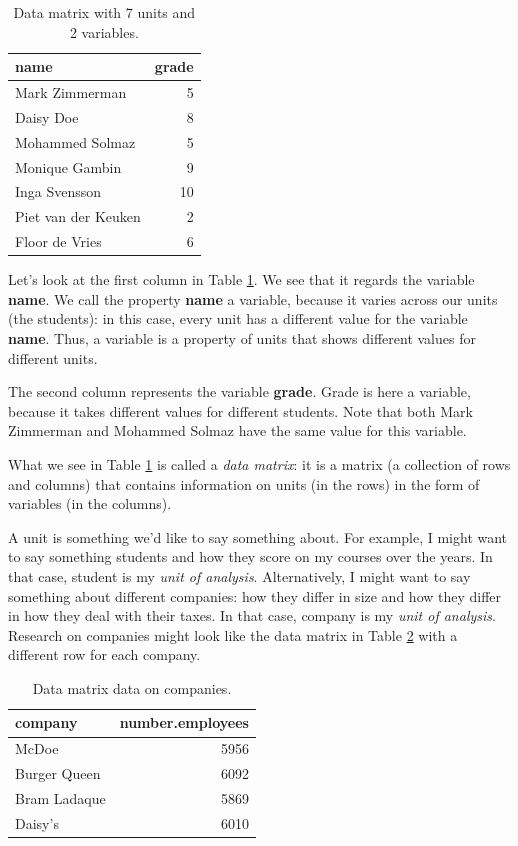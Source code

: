 \documentclass[]{report}\usepackage[]{graphicx}\usepackage[]{color}
\begin{document}
\begin{table}[ht]
\centering
\caption{Data matrix with 7 units and 2 variables.} 
\label{tab:data_1}
\begin{tabular}{lr}
  \hline
name & grade \\ 
  \hline
Mark Zimmerman & 5 \\ 
  Daisy Doe & 8 \\ 
  Mohammed Solmaz & 5 \\ 
  Monique Gambin & 9 \\ 
  Inga Svensson & 10 \\ 
  Piet van der Keuken & 2 \\ 
  Floor de Vries & 6 \\ 
   \hline
\end{tabular}
\end{table}


Let's look at the first column in Table \ref{tab:data_1}. We see that it regards the variable \textbf{name}. We call the property \textbf{name} a variable, because it varies across our units (the students): in this case, every unit has a different value for the variable \textbf{name}. Thus, a variable is a property of units that shows different values for different units.

The second column represents the variable \textbf{grade}. Grade is here a variable, because it takes different values for different students. Note that both Mark Zimmerman and Mohammed Solmaz have the same value for this variable.

What we see in Table \ref{tab:data_1} is called a \textit{data matrix}: it is a matrix (a collection of rows and columns) that contains information on units (in the rows) in the form of variables (in the columns).

A unit is something we'd like to say something about. For example, I might want to say something students and how they score on my courses over the years. In that case, student is my \textit{unit of analysis}. Alternatively, I might want to say something about different companies: how they differ in size and how they differ in how they deal with their taxes. In that case, company is my \textit{unit of analysis}. Research on companies might look like the data matrix in Table \ref{tab:data_2} with a different row for each company.

\begin{table}[ht]
\centering
\caption{Data matrix data on companies.} 
\label{tab:data_2}
\begin{tabular}{lr}
  \hline
company & number.employees \\ 
  \hline
McDoe & 5956 \\ 
  Burger Queen & 6092 \\ 
  Bram Ladaque & 5869 \\ 
  Daisy's & 6010 \\ 
   \hline
\end{tabular}
\end{table}
\end{document}
